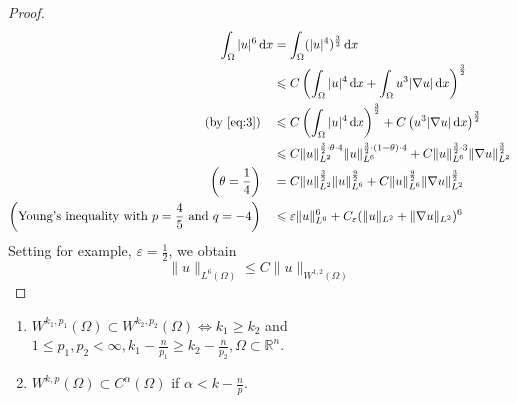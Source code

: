 \documentclass{report}
\begin{document}
\begin{proof}
    \begin{align*}
        \int_{\Omega} \vert u \vert^{6} \,\mathrm{d}x &= \int_{\Omega} (\vert u \vert^{4})^{\frac{3}{2}} \,\mathrm{d}x \\
        &\leq C \left(\int_{\Omega} \vert u \vert^{4} \,\mathrm{d}x + \int_{\Omega} u^{3}|\nabla u| \,\mathrm{d}x \right)^{\frac{3}{2}} \\
        (\text{by \eqref{eq:3}}) \quad &\leq C \left(\int_{\Omega} \vert u \vert^{4} \,\mathrm{d}x\right)^{\frac{3}{2}} + C \left(u^{3}|\nabla u| \,\mathrm{d}x \right)^{\frac{3}{2}} \\
        &\leq C \|u\|^{\frac{3}{2}\cdot \theta \cdot 4}_{L^{2}} \|u\|^{\frac{3}{2}\cdot (1-\theta) \cdot 4}_{L^{6}} + C \|u\|^{\frac{3}{2}\cdot 3}_{L^{6}} \|\nabla u\|^{\frac{3}{2}}_{L^{2}} \\
        \left(\theta = \frac{1}{4}\right) \quad &= C \|u\|^{\frac{3}{2}}_{L^{2}} \|u\|^{\frac{9}{2}}_{L^{6}} + C\|u\|^{\frac{9}{2}}_{L^{6}} \|\nabla u\|^{\frac{3}{2}}_{L^{2}} \\
        \left(\text{Young's inequality with } p=\frac{4}{5} \text{ and }q=-4\right) \quad &\leq \varepsilon \|u\|^{6}_{L^{6}} + C_{\varepsilon}(\|u\|_{L^{2}} + \|\nabla u\|_{L^{2}})^{6}
    \end{align*}
    Setting for example, \(\varepsilon = \frac{1}{2}\), we obtain
    \[\|u\|_{L^{6}(\Omega)} \leq C \|u\|_{W^{1, 2}(\Omega)}\]
\end{proof}

{
    \begin{enumerate}[label=\bfseries\tiny\protect\circled{\small\arabic*}]
		\item \(W^{k_1, p_1}(\Omega) \subset W^{k_2, p_2}(\Omega) \Longleftrightarrow k_1 \geq k_2\) and \(1 \leq p_1, p_2 < \infty, k_1 - \frac{n}{p_1} \geq k_2 - \frac{n}{p_2}, \Omega \subset \mathbb{R}^{n}\).
		\item \(W^{k,p}(\Omega) \subset C^{\alpha}(\Omega)\) if \(\alpha < k - \frac{n}{p}\).
	\end{enumerate}
}
\end{document}

